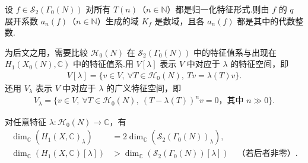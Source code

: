 \begin{corollary*}

设 $f\in\mathcal S_2(\Gamma_0(N))$ 对所有 $T(n)$（$n\in\mathbb N$）都是归一化特征形式.则由 $f$ 的 $q$ 展开系数 $a_n(f)$（$n\in\mathbb N$）生成的域 $K_f$ 是数域，且各 $a_n(f)$ 都是其中的代数整数.

\end{corollary*}

为后文之用，需要比较 $\mathcal H_0(N)$ 在 $\mathcal S_2(\Gamma_0(N))$ 中的特征值系与出现在 $H_1(X_0(N),\mathbb C)$ 中的特征值系.用 $V[\lambda]$ 表示 $V$ 中对应于 $\lambda$ 的特征空间，即
\begin{align*}
V[\lambda]=\{v\in V,\ \forall T\in\mathcal H_0(N),\ Tv=\lambda(T)v\}.
\end{align*}
还用 $V_\lambda$ 表示 $V$ 中对应于 $\lambda$ 的广义特征空间，即
\begin{align*}
V_\lambda=\{v\in V,\ \forall T\in\mathcal H_0(N),\ (T-\lambda(T))^nv=0\text{，其中 }n\gg0\}.
\end{align*}
\begin{proposition*}

对任意特征 $\lambda:\mathcal H_0(N)\longrightarrow\mathbb C$，有
\begin{align*}
\dim_{\mathbb C}(H_1(X,\mathbb C)_\lambda)&=2\dim_{\mathbb C}(\mathcal S_2(\Gamma_0(N))_\lambda),\\
\dim_{\mathbb C}(H_1(X,\mathbb C)[\lambda])&>\dim_{\mathbb C}(\mathcal S_2(\Gamma_0(N))[\lambda])\quad\text{（若后者非零）}.
\end{align*}
\end{proposition*}

